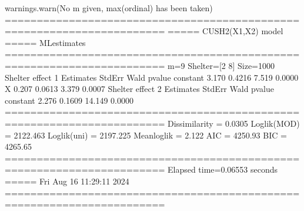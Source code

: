 \documentclass[letterpaper,10pt,english]{sphinxmanual}
\begin{document}
\begin{sphinxVerbatim}[commandchars=\\\{\}]
warnings.warn(\PYGZdq{}No m given, max(ordinal) has been taken\PYGZdq{})
=======================================================================
=====\PYGZgt{}\PYGZgt{}\PYGZgt{} CUSH2(X1,X2) model \PYGZlt{}\PYGZlt{}\PYGZlt{}===== ML\PYGZhy{}estimates
=======================================================================
m=9  Shelter=[2 8]  Size=1000
\PYGZhy{}\PYGZhy{}\PYGZhy{}\PYGZhy{}\PYGZhy{}\PYGZhy{}\PYGZhy{}\PYGZhy{}\PYGZhy{}\PYGZhy{}\PYGZhy{}\PYGZhy{}\PYGZhy{}\PYGZhy{}\PYGZhy{}\PYGZhy{}\PYGZhy{}\PYGZhy{}\PYGZhy{}\PYGZhy{}\PYGZhy{}\PYGZhy{}\PYGZhy{}\PYGZhy{}\PYGZhy{}\PYGZhy{}\PYGZhy{}\PYGZhy{}\PYGZhy{}\PYGZhy{}\PYGZhy{}\PYGZhy{}\PYGZhy{}\PYGZhy{}\PYGZhy{}\PYGZhy{}\PYGZhy{}\PYGZhy{}\PYGZhy{}\PYGZhy{}\PYGZhy{}\PYGZhy{}\PYGZhy{}\PYGZhy{}\PYGZhy{}\PYGZhy{}\PYGZhy{}\PYGZhy{}\PYGZhy{}\PYGZhy{}\PYGZhy{}\PYGZhy{}\PYGZhy{}\PYGZhy{}\PYGZhy{}\PYGZhy{}\PYGZhy{}\PYGZhy{}\PYGZhy{}\PYGZhy{}\PYGZhy{}\PYGZhy{}\PYGZhy{}\PYGZhy{}\PYGZhy{}\PYGZhy{}\PYGZhy{}\PYGZhy{}\PYGZhy{}\PYGZhy{}\PYGZhy{}
Shelter effect 1
          Estimates  StdErr     Wald  p\PYGZhy{}value
constant     \PYGZhy{}3.170  0.4216   \PYGZhy{}7.519   0.0000
X             0.207  0.0613    3.379   0.0007
\PYGZhy{}\PYGZhy{}\PYGZhy{}\PYGZhy{}\PYGZhy{}\PYGZhy{}\PYGZhy{}\PYGZhy{}\PYGZhy{}\PYGZhy{}\PYGZhy{}\PYGZhy{}\PYGZhy{}\PYGZhy{}\PYGZhy{}\PYGZhy{}\PYGZhy{}\PYGZhy{}\PYGZhy{}\PYGZhy{}\PYGZhy{}\PYGZhy{}\PYGZhy{}\PYGZhy{}\PYGZhy{}\PYGZhy{}\PYGZhy{}\PYGZhy{}\PYGZhy{}\PYGZhy{}\PYGZhy{}\PYGZhy{}\PYGZhy{}\PYGZhy{}\PYGZhy{}\PYGZhy{}\PYGZhy{}\PYGZhy{}\PYGZhy{}\PYGZhy{}\PYGZhy{}\PYGZhy{}\PYGZhy{}\PYGZhy{}\PYGZhy{}\PYGZhy{}\PYGZhy{}\PYGZhy{}\PYGZhy{}\PYGZhy{}\PYGZhy{}\PYGZhy{}\PYGZhy{}\PYGZhy{}\PYGZhy{}\PYGZhy{}\PYGZhy{}\PYGZhy{}\PYGZhy{}\PYGZhy{}\PYGZhy{}\PYGZhy{}\PYGZhy{}\PYGZhy{}\PYGZhy{}\PYGZhy{}\PYGZhy{}\PYGZhy{}\PYGZhy{}\PYGZhy{}\PYGZhy{}
Shelter effect 2
          Estimates  StdErr     Wald  p\PYGZhy{}value
constant     \PYGZhy{}2.276  0.1609  \PYGZhy{}14.149   0.0000
=======================================================================
Dissimilarity = 0.0305
Loglik(MOD)   = \PYGZhy{}2122.463
Loglik(uni)   = \PYGZhy{}2197.225
Mean\PYGZhy{}loglik   = \PYGZhy{}2.122
\PYGZhy{}\PYGZhy{}\PYGZhy{}\PYGZhy{}\PYGZhy{}\PYGZhy{}\PYGZhy{}\PYGZhy{}\PYGZhy{}\PYGZhy{}\PYGZhy{}\PYGZhy{}\PYGZhy{}\PYGZhy{}\PYGZhy{}\PYGZhy{}\PYGZhy{}\PYGZhy{}\PYGZhy{}\PYGZhy{}\PYGZhy{}\PYGZhy{}\PYGZhy{}\PYGZhy{}\PYGZhy{}\PYGZhy{}\PYGZhy{}\PYGZhy{}\PYGZhy{}\PYGZhy{}\PYGZhy{}\PYGZhy{}\PYGZhy{}\PYGZhy{}\PYGZhy{}\PYGZhy{}\PYGZhy{}\PYGZhy{}\PYGZhy{}\PYGZhy{}\PYGZhy{}\PYGZhy{}\PYGZhy{}\PYGZhy{}\PYGZhy{}\PYGZhy{}\PYGZhy{}\PYGZhy{}\PYGZhy{}\PYGZhy{}\PYGZhy{}\PYGZhy{}\PYGZhy{}\PYGZhy{}\PYGZhy{}\PYGZhy{}\PYGZhy{}\PYGZhy{}\PYGZhy{}\PYGZhy{}\PYGZhy{}\PYGZhy{}\PYGZhy{}\PYGZhy{}\PYGZhy{}\PYGZhy{}\PYGZhy{}\PYGZhy{}\PYGZhy{}\PYGZhy{}\PYGZhy{}
AIC = 4250.93
BIC = 4265.65
=======================================================================
Elapsed time=0.06553 seconds =====\PYGZgt{}\PYGZgt{}\PYGZgt{} Fri Aug 16 11:29:11 2024
=======================================================================
\end{sphinxVerbatim}
\end{document}
